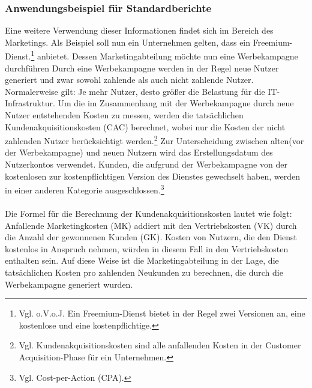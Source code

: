 \subsubsection*{Anwendungsbeispiel für Standardberichte}
Eine weitere Verwendung dieser Informationen findet sich im Bereich des Marketings. Als Beispiel soll nun ein Unternehmen gelten, dass ein Freemium-Dienst.\footnote{Vgl. o.V.o.J. Ein Freemium-Dienst bietet in der Regel zwei Versionen an, eine kostenlose und eine kostenpflichtige\cite{MAR2}.} anbietet. Dessen Marketingabteilung möchte nun eine Werbekampagne durchführen Durch eine Werbekampagne werden in der Regel neue Nutzer generiert und zwar sowohl zahlende als auch nicht zahlende Nutzer. Normalerweise gilt: Je mehr Nutzer, desto größer die Belastung für die IT-Infrastruktur. Um die im Zusammenhang mit der Werbekampagne durch neue Nutzer entstehenden Kosten zu messen, werden die tatsächlichen Kundenakquisitionskosten (CAC) berechnet, wobei nur die Kosten der nicht zahlenden Nutzer berücksichtigt werden.\footnote{Vgl. Kundenakquisitionskosten sind alle anfallenden Kosten in der Customer Acquisition-Phase für ein Unternehmen\cite{MAR1}.} Zur Unterscheidung zwischen alten(vor der Werbekampagne) und neuen Nutzern wird das Erstellungsdatum des Nutzerkontos verwendet. Kunden, die aufgrund der Werbekampagne von der kostenlosen zur kostenpflichtigen Version des Dienstes gewechselt haben, werden in einer anderen Kategorie ausgeschlossen.\footnote{Vgl. Cost-per-Action (CPA)\cite{MAR3}.}
\\\\ 
Die Formel für die Berechnung der Kundenakquisitionskosten lautet wie folgt:\\
Anfallende Marketingkosten (MK) addiert mit den Vertriebskosten (VK) durch die Anzahl der gewonnenen Kunden (GK). Kosten von Nutzern, die den Dienst kostenlos in Anspruch nehmen, würden in diesem Fall in den Vertriebskosten enthalten sein. Auf diese Weise ist die Marketingabteilung in der Lage, die tatsächlichen Kosten pro zahlenden Neukunden zu berechnen, die durch die Werbekampagne generiert wurden.  

